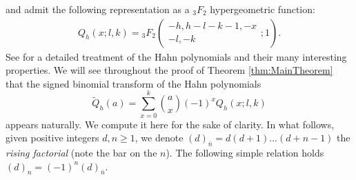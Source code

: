 \documentclass[11pt, a4paper, oneside, reqno]{amsart}
\theoremstyle{remark}
\theoremstyle{definition}
\numberwithin{equation}{section}
\begin{document}
and admit the following representation as a ${}_3F_2$ hypergeometric function:
\begin{align*}
	Q_h(x;l,k) = {}_3F_2(\begin{matrix}-h, h-l-k-1, -x \\ -l, -k\end{matrix}; 1).
\end{align*}
See \cite{Karlin1961} for a detailed treatment of the Hahn polynomials and their many interesting properties. 
We will see throughout the proof of Theorem \ref{thm:MainTheorem} that the signed binomial transform of the Hahn polynomials
$$
	\tilde{Q}_h(a)=\sum_{x=0}^k\binom{a}{x}(-1)^{x}Q_h(x;l,k)
$$
appears naturally. We compute it here for the sake of clarity. In what follows, given positive integers $d,n\geq 1$, we denote $(d)_{\bar{n}}= d(d+1)...(d+n-1)$ the \emph{rising factorial} (note the bar on the $n$). The following simple relation holds $(d)_n = (-1)^n(d)_{\bar{n}}$.
\end{document}
